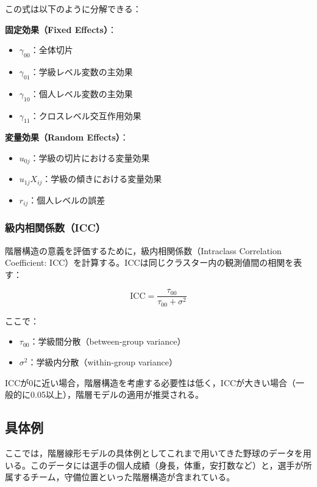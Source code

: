\documentclass[
  a4paper,
]{ltjsbook}
\providecommand{\tightlist}{%
  \setlength{\itemsep}{0pt}\setlength{\parskip}{0pt}}
\begin{document}
この式は以下のように分解できる：

\textbf{固定効果（Fixed Effects）}：

\begin{itemize}
\tightlist
\item
  \(\gamma_{00}\)：全体切片
\item
  \(\gamma_{01}\)：学級レベル変数の主効果
\item
  \(\gamma_{10}\)：個人レベル変数の主効果
\item
  \(\gamma_{11}\)：クロスレベル交互作用効果
\end{itemize}

\textbf{変量効果（Random Effects）}：

\begin{itemize}
\tightlist
\item
  \(u_{0j}\)：学級の切片における変量効果
\item
  \(u_{1j}X_{ij}\)：学級の傾きにおける変量効果
\item
  \(r_{ij}\)：個人レベルの誤差
\end{itemize}

\subsubsection{級内相関係数（ICC）}\label{ux7d1aux5185ux76f8ux95a2ux4fc2ux6570icc}

階層構造の意義を評価するために，級内相関係数（Intraclass Correlation
Coefficient:
ICC）を計算する。ICCは同じクラスター内の観測値間の相関を表す：

\[
\text{ICC} = \frac{\tau_{00}}{\tau_{00} + \sigma^2}
\]

ここで：

\begin{itemize}
\tightlist
\item
  \(\tau_{00}\)：学級間分散（between-group variance）
\item
  \(\sigma^2\)：学級内分散（within-group variance）
\end{itemize}

ICCが0に近い場合，階層構造を考慮する必要性は低く，ICCが大きい場合（一般的に0.05以上），階層モデルの適用が推奨される。

\subsection{具体例}\label{ux5177ux4f53ux4f8b}

ここでは，階層線形モデルの具体例としてこれまで用いてきた野球のデータを用いる。このデータには選手の個人成績（身長，体重，安打数など）と，選手が所属するチーム，守備位置といった階層構造が含まれている。
\end{document}

